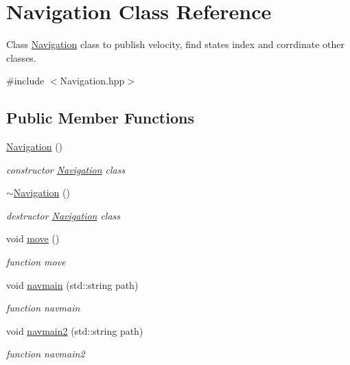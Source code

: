 \hypertarget{classNavigation}{}\section{Navigation Class Reference}
\label{classNavigation}


Class \hyperlink{classNavigation}{Navigation} class to publish velocity, find states index and corrdinate other classes.  




{\ttfamily \#include $<$Navigation.\+hpp$>$}

\subsection*{Public Member Functions}
\begin{DoxyCompactItemize}
\item 
\hyperlink{classNavigation_a81fdffdefe46340da5fa6c570066b42b}{Navigation} ()
\begin{DoxyCompactList}\small\item\em constructor \hyperlink{classNavigation}{Navigation} class \end{DoxyCompactList}\item 
\hyperlink{classNavigation_addd4022d716df48f4e55a1db69361ba7}{$\sim$\+Navigation} ()
\begin{DoxyCompactList}\small\item\em destructor \hyperlink{classNavigation}{Navigation} class \end{DoxyCompactList}\item 
void \hyperlink{classNavigation_a9328ca0f132d8e87480e592a82687604}{move} ()
\begin{DoxyCompactList}\small\item\em function move \end{DoxyCompactList}\item 
void \hyperlink{classNavigation_abcd57a6d8649243a86a7f092f8217e78}{navmain} (std\+::string path)
\begin{DoxyCompactList}\small\item\em function navmain \end{DoxyCompactList}\item 
void \hyperlink{classNavigation_ad019d5b5c0d97ce13310b7de38156c77}{navmain2} (std\+::string path)
\begin{DoxyCompactList}\small\item\em function navmain2 \end{DoxyCompactList}\item 

\end{DoxyCompactItemize}
